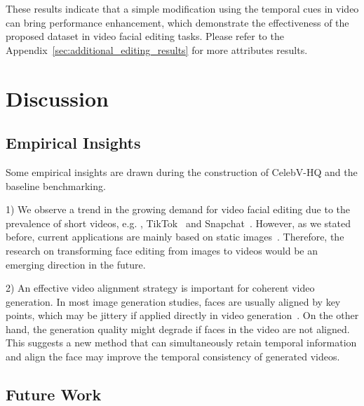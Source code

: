 These results indicate that a simple modification using the temporal cues in video can bring performance enhancement, which demonstrate the effectiveness of the proposed dataset in video facial editing tasks. Please refer to the Appendix~\ref{sec:additional_editing_results} for more attributes results.

\section{Discussion}

\subsection{Empirical Insights} Some empirical insights are drawn during the construction of CelebV-HQ and the baseline benchmarking. 

1) We observe a trend in the growing demand for video facial editing due to the prevalence of short videos, e.g. , TikTok~\cite{tiktok} and Snapchat~\cite{snapchat}. However, as we stated before, current applications are mainly based on static images~\cite{faceapp,snapchat}. Therefore, the research on transforming face editing from images to videos would be an emerging direction in the future. 

2) An effective video alignment strategy is important for coherent video generation. In most image generation studies, faces are usually aligned by key points, which may be jittery if applied directly in video generation~\cite{bilayermodel}. On the other hand, the generation quality might degrade if faces in the video are not aligned. This suggests a new method that can simultaneously retain temporal information and align the face may improve the temporal consistency of generated videos.

\subsection{Future Work}


